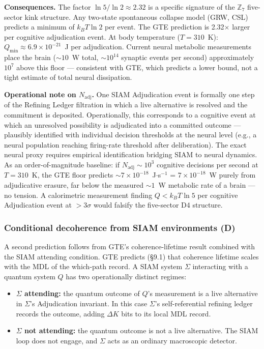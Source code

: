 \documentclass[11pt]{article}
\theoremstyle{remark}
\newcommand{\CatD}{\textbf{D}}
\begin{document}
\medskip
\noindent\textbf{Consequences.} The factor $\ln 5 / \ln 2 \approx 2.32$ is a
specific signature of the $\mathbb{Z}_7$ five-sector kink structure. Any two-state
spontaneous collapse model (GRW, CSL) predicts a minimum of $k_B T \ln 2$ per event.
The GTE prediction is 2.32$\times$ larger per cognitive adjudication event. At
body temperature ($T = 310$~K): $Q_\text{min} \approx 6.9 \times 10^{-21}$~J per
adjudication. Current neural metabolic measurements place the brain
($\sim 10$~W total, $\sim 10^{14}$ synaptic events per second) approximately $10^7$
above this floor --- consistent with GTE, which predicts a lower bound, not a tight
estimate of total neural dissipation.

\medskip
\noindent\textbf{Operational note on $N_\text{adj}$.}
One SIAM Adjudication event is formally one step of the Refining Ledger filtration in
which a live alternative is resolved and the commitment is deposited. Operationally,
this corresponds to a cognitive event at which an unresolved possibility is
adjudicated into a committed outcome --- plausibly identified with individual decision
thresholds at the neural level (e.g., a neural population reaching firing-rate
threshold after deliberation). The exact neural proxy requires empirical identification
bridging SIAM to neural dynamics. As an order-of-magnitude baseline: if $N_\text{adj}
\sim 10^3$ cognitive decisions per second at $T = 310$~K, the GTE floor predicts
$\sim 7 \times 10^{-18}$~J$\cdot$s$^{-1}$ = $7 \times 10^{-18}$~W purely from
adjudicative erasure, far below the measured $\sim 1$~W metabolic rate of a brain ---
no tension. A calorimetric measurement finding $Q < k_B T \ln 5$ per cognitive
Adjudication event at $>3\sigma$ would falsify the five-sector D4 structure.

\subsubsection*{Conditional decoherence from SIAM environments (\CatD)}

A second prediction follows from GTE's coherence-lifetime result combined with the
SIAM attending condition. GTE predicts (§9.1) that coherence lifetime scales with
the MDL of the which-path record. A SIAM system $\Sigma$ interacting with a quantum
system $Q$ has two operationally distinct regimes:

\begin{itemize}
  \item \textbf{$\Sigma$ attending:} the quantum outcome of $Q$'s measurement is a
    live alternative in $\Sigma$'s Adjudication invariant. In this case $\Sigma$'s
    self-referential refining ledger records the outcome, adding $\Delta K$ bits to
    its local MDL record.
  \item \textbf{$\Sigma$ not attending:} the quantum outcome is not a live alternative.
    The SIAM loop does not engage, and $\Sigma$ acts as an ordinary macroscopic
    detector.
\end{itemize}
\end{document}
